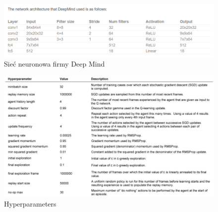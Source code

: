 \documentclass[12pt]{article}
\begin{document}
\begin{figure}[H]
\centering \includegraphics[scale=0.7]{deep_mind_architecture.PNG}
\caption{Sieć neuronowa firmy Deep Mind}
\label{simple1}
\end{figure}


\begin{figure}[H]
\centering \includegraphics[scale=0.6]{hyperparameters.PNG}
\caption{Hyperparameters}
\label{simple1}
\end{figure}
\end{document}
